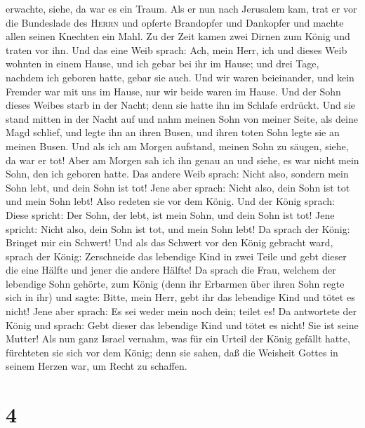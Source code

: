 erwachte, siehe, da war es ein Traum. Als er nun nach Jerusalem kam,
trat er vor die Bundeslade des \textsc{Herrn} und opferte Brandopfer und
Dankopfer und machte allen seinen Knechten ein Mahl.  Zu
der Zeit kamen zwei Dirnen zum König und traten vor ihn. 
Und das eine Weib sprach: Ach, mein Herr, ich und dieses Weib wohnten in
einem Hause, und ich gebar bei ihr im Hause;  und drei
Tage, nachdem ich geboren hatte, gebar sie auch. Und wir waren
beieinander, und kein Fremder war mit uns im Hause, nur wir beide waren
im Hause.  Und der Sohn dieses Weibes starb in der Nacht;
denn sie hatte ihn im Schlafe erdrückt.  Und sie stand
mitten in der Nacht auf und nahm meinen Sohn von meiner Seite, als deine
Magd schlief, und legte ihn an ihren Busen, und ihren toten Sohn legte
sie an meinen Busen.  Und als ich am Morgen aufstand,
meinen Sohn zu säugen, siehe, da war er tot! Aber am Morgen sah ich ihn
genau an und siehe, es war nicht mein Sohn, den ich geboren hatte.
 Das andere Weib sprach: Nicht also, sondern mein Sohn
lebt, und dein Sohn ist tot! Jene aber sprach: Nicht also, dein Sohn ist
tot und mein Sohn lebt! Also redeten sie vor dem König. 
Und der König sprach: Diese spricht: Der Sohn, der lebt, ist mein Sohn,
und dein Sohn ist tot! Jene spricht: Nicht also, dein Sohn ist tot, und
mein Sohn lebt!  Da sprach der König: Bringet mir ein
Schwert! Und als das Schwert vor den König gebracht ward,
 sprach der König: Zerschneide das lebendige Kind in zwei
Teile und gebt dieser die eine Hälfte und jener die andere Hälfte!
 Da sprach die Frau, welchem der lebendige Sohn gehörte,
zum König (denn ihr Erbarmen über ihren Sohn regte sich in ihr) und
sagte: Bitte, mein Herr, gebt ihr das lebendige Kind und tötet es nicht!
Jene aber sprach: Es sei weder mein noch dein; teilet es!
 Da antwortete der König und sprach: Gebt dieser das
lebendige Kind und tötet es nicht! Sie ist seine Mutter! 
Als nun ganz Israel vernahm, was für ein Urteil der König gefällt hatte,
fürchteten sie sich vor dem König; denn sie sahen, daß die Weisheit
Gottes in seinem Herzen war, um Recht zu schaffen.

\hypertarget{section-3}{%
\section{4}\label{section-3}}

